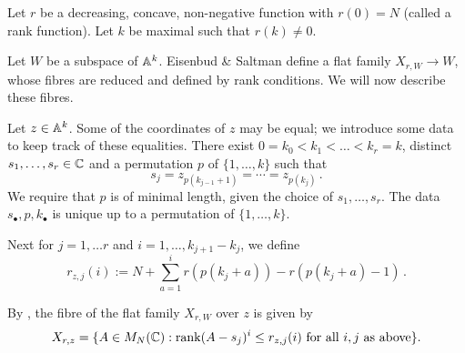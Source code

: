 \documentclass[draft]{article}
\begin{document}
Let $ r $ be a decreasing, concave, non-negative function with $r(0) = N$ (called a rank function).  Let $k $ be maximal such that $ r(k) \ne 0 $.
   

Let $ W$ be a subspace of $ \AA^k$. Eisenbud \& Saltman define a flat family $ X_{r,W} \rightarrow W$, whose fibres are reduced and defined by rank conditions. We will now describe these fibres.

Let $ z \in \AA^k$. Some of the coordinates of $z$ may be equal; we introduce some data to keep track of these equalities. There exist $ 0=k_0< k_1< \dots < k_r = k $, distinct $ s_1, \dots, s_r \in \CC$ and a permutation  $ p $ of $ \{1, \dots, k\}$ such that 
$$ s_j = z_{p(k_{j-1}+1)} = \cdots = z_{p(k_j)}\,. $$ We require that $ p $ is of minimal length, given the choice of $ s_1, \dots, s_r$.  The data $s_\bullet, p, k_\bullet$ is unique up to a permutation of $ \{1, \dots, k\}$.



Next for $ j = 1, \dots r $ and $ i = 1, \dots, k_{j+1} - k_j$, we define
$$
    r_{z,j}(i):= N + \sum_{a = 1}^i r(p(k_j + a)) - r(p(k_j +a) - 1)  \, . 
$$

% 
By \cite[Corollary 2.2]{eisenbud1989rank}, the fibre of the flat family $ X_{r,W} $ over $ z$ is given by
\begin{equation} \label{eq:ESfibre}
X_{r,z} = \{ A \in M_N(\CC) :\rk (A-s_j)^i\le r_{z,j}(i) \text{ for all } i , j \text{ as above}\}.
\end{equation}
\end{document}
